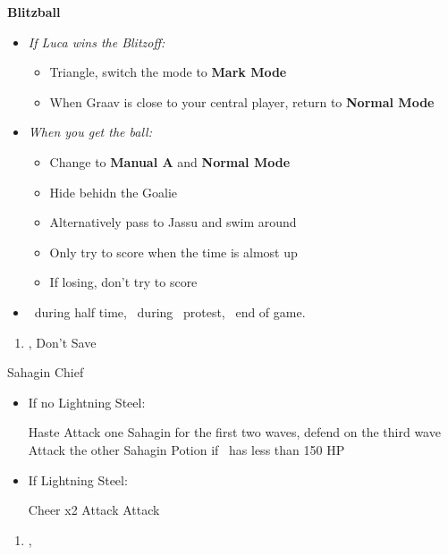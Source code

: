 \begin{trial}
	\textbf{Blitzball}
	\begin{itemize}
		\item \textit{If Luca wins the Blitzoff:}
		\begin{itemize}
			\item Triangle, switch the mode to \textbf{Mark Mode}
			\item When Graav is close to your central player, return to \textbf{Normal Mode}
		\end{itemize}
		\item \textit{When you get the ball:}
		\begin{itemize}
			\item Change to \textbf{Manual A} and \textbf{Normal Mode}
			\item Hide behidn the Goalie
			\item Alternatively pass to Jassu and swim around
			\item Only try to score when the time is almost up
			\item If losing, don't try to score
		\end{itemize}
		\item \sd\ during half time, \sd\ during \wakka\ protest, \sd\ end of game.
	\end{itemize}
\end{trial}
\begin{enumerate}[resume]
	\item \cs[1:00], Don't Save
\end{enumerate}
\begin{battle}{Sahagin Chief}
	\begin{itemize}
		\item{If no Lightning Steel:}
		\begin{itemize}
			\tidusf Haste \tidus
			\wakkaf Attack one Sahagin for the first two waves, defend on the third wave
			\tidusf Attack the other Sahagin
			\wakkaf Potion if \tidus\ has less than 150 HP
		\end{itemize}
		\item{If Lightning Steel:}
		\begin{itemize}
			\tidusf Cheer x2
			\wakkaf Attack
			\tidusf Attack
		\end{itemize}
	\end{itemize}
\end{battle}
\begin{enumerate}[resume]
	\item \sd, \skippablefmv
\end{enumerate}
